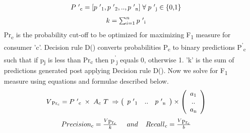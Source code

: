   \begin{equation}
    \begin{array}{l}
      P\textsuperscript{'}\textsubscript{c} = [p\textsuperscript{'}\textsubscript{1}, 
      p\textsuperscript{'}\textsubscript{2}, .., p\textsuperscript{'}\textsubscript{n}]\; 
      \forall \; p\textsuperscript{'}\textsubscript{j} \in \; $\{0,1\}$
    \end{array}
    \label{eqn:Pdash}
  \end{equation}
  \begin{equation}
    \begin{array}{l}
      k =\sum_{i=1}^{n}p\textsuperscript{'}\textsubscript{i}
    \end{array}
    \label{eqn:Pdash}
  \end{equation}
Pr\textsubscript{c} is the probability cut-off to be optimized for maximizing F\textsubscript{1} measure \cite{lipton2014optimal} 
for consumer 'c'. Decision rule D() converts probabilities P\textsubscript{c} to binary predictions 
P\textsuperscript{'}\textsubscript{c} such that if p\textsubscript{j} is less than 
Pr\textsubscript{c} then p\textsuperscript{'}\textsubscript{j} equals 0, otherwise 1.
'k' is the sum of predictions generated post applying Decision rule D(). Now we solve for F\textsubscript{1} measure
using equations and formulae described below.
  \begin{equation}
    \begin{array}{l}
      V\textsubscript{Pr\textsubscript{c}} = 
      P\textsuperscript{'}\textsubscript{c}
      \;\times\; A\textsubscript{c}\textsuperscript{T}
      \;
      \Rightarrow	
      \left( \begin{array}{ccc}
      p\textsuperscript{'}\textsubscript{1} & .. & 
      p\textsuperscript{'}\textsubscript{n}
      \end{array} \right)
      \times
      \left( \begin{array}{ccc}
      a\textsubscript{1} \\
      .. \\
      a\textsubscript{n} \\
      \end{array} \right)
    \end{array}
    \label{eqn:probability}
  \end{equation}
  \begin{equation}
    \begin{array}{l}
      Precision\textsubscript{c}= \frac{V\textsubscript{Pr\textsubscript{c}}} {k}
      \;\;\;\;\;and\;\;\;\;
      Recall\textsubscript{c}= \frac{V\textsubscript{Pr\textsubscript{c}}} {b}
    \end{array}
    \label{eqn:F1}
  \end{equation}
